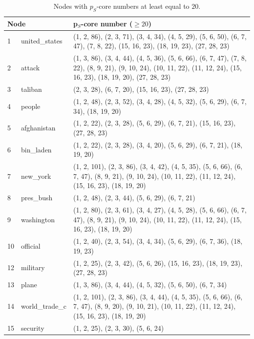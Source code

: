 \documentclass[a4paper,twoside,10pt]{article}
\begin{document}
\begin{center}
\begin{longtable}{p{}p{}p{}}
\caption{Nodes with $p_S$-core numbers at least equal to $20.$}
\label{reuterscore20}\\
 \multicolumn{2}{l}{\textbf{Node}} & \textbf{p$_S$-core number} ($\geq 20$)\\
 \endhead
1 & united\_states&(1, 2, 86), (2, 3, 71), (3, 4, 34), (4, 5, 29), (5, 6, 50), (6, 7, 47), (7, 8, 22), (15, 16, 23), (18, 19, 23), (27, 28, 23)\\
2 & attack       &(1, 3, 86), (3, 4, 44), (4, 5, 36), (5, 6, 66), (6, 7, 47), (7, 8, 22), (8, 9, 21), (9, 10, 24), (10, 11, 22), (11, 12, 24), (15, 16, 23), (18, 19, 20), (27, 28, 23)\\
  3 & taliban      &(2, 3, 28), (6, 7, 20), (15, 16, 23), (27, 28, 23)\\
  4 & people       &(1, 2, 48), (2, 3, 52), (3, 4, 28), (4, 5, 32), (5, 6, 29), (6, 7, 34), (18, 19, 20)\\
  5 & afghanistan  &(1, 2, 22), (2, 3, 28), (5, 6, 29), (6, 7, 21), (15, 16, 23), (27, 28, 23)\\
  6 & bin\_laden    &(1, 2, 22), (2, 3, 28), (3, 4, 20), (5, 6, 29), (6, 7, 21), (18, 19, 20)\\
7 & new\_york     &(1, 2, 101), (2, 3, 86), (3, 4, 42), (4, 5, 35), (5, 6, 66), (6, 7, 47), (8, 9, 21), (9, 10, 24), (10, 11, 22), (11, 12, 24), (15, 16, 23), (18, 19, 20)\\
  8 & pres\_bush    &(1, 2, 48), (2, 3, 44), (5, 6, 29), (6, 7, 21)\\
9 & washington   &(1, 2, 80), (2, 3, 61), (3, 4, 27), (4, 5, 28), (5, 6, 66), (6, 7, 47), (8, 9, 21), (9, 10, 24), (10, 11, 22), (11, 12, 24), (15, 16, 23), (18, 19, 20)\\
 10 & official     &(1, 2, 40), (2, 3, 54), (3, 4, 34), (5, 6, 29), (6, 7, 36), (18, 19, 23)\\
 12 & military     &(1, 2, 25), (2, 3, 42), (5, 6, 26), (15, 16, 23), (18, 19, 23), (27, 28, 23)\\
  13 & plane        &(1, 3, 86), (3, 4, 44), (4, 5, 32), (5, 6, 50), (6, 7, 34)\\
14 & world\_trade\_c&(1, 2, 101), (2, 3, 86), (3, 4, 44), (4, 5, 35), (5, 6, 66), (6, 7, 47), (8, 9, 20), (9, 10, 21), (10, 11, 22), (11, 12, 24), (15, 16, 23), (18, 19, 20)\\
 15 & security     &(1, 2, 25), (2, 3, 30), (5, 6, 24)\\

\end{longtable}
\end{center}
\end{document}
